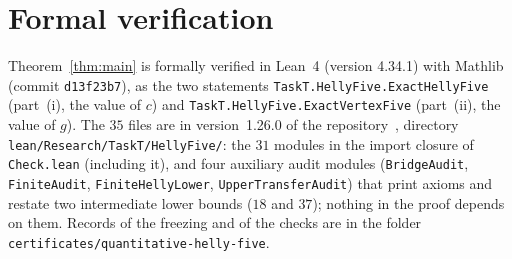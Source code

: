 \documentclass[11pt]{article}
\theoremstyle{definition}
\theoremstyle{remark}
\newcommand{\repoversion}{1.26.0}
\begin{document}
{\sloppy
\section{Formal verification}\label{sec:lean}

Theorem~\ref{thm:main} is formally verified in Lean~4 (version 4.34.1) with
Mathlib~\cite{mathlib} (commit \texttt{d13f23b7}), as the two statements
\texttt{TaskT.HellyFive.ExactHellyFive} (part~(i), the value of $c$) and
\texttt{TaskT.HellyFive.ExactVertexFive} (part~(ii), the value of $g$). The
$35$ files are in version~\repoversion{} of the repository~\cite{repo},
directory \texttt{lean/Research/TaskT/HellyFive/}: the $31$ modules in the
import closure of \texttt{Check.lean} (including it), and four auxiliary audit
modules (\texttt{BridgeAudit}, \texttt{FiniteAudit},
\texttt{FiniteHellyLower}, \texttt{UpperTransferAudit}) that print axioms and
restate two intermediate lower bounds ($18$ and $37$); nothing in the proof
depends on them. Records of the freezing and of the checks are in the folder
\texttt{certificates/quantitative-helly-five}.

}
\end{document}
